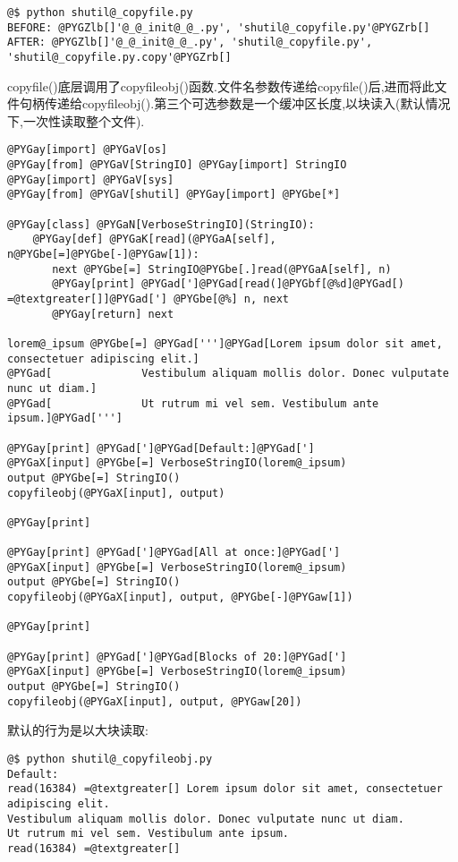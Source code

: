 \documentclass[a4paper,10pt,english]{manual}
\begin{document}
\begin{Verbatim}[commandchars=@\[\]]
@$ python shutil@_copyfile.py
BEFORE: @PYGZlb[]'@_@_init@_@_.py', 'shutil@_copyfile.py'@PYGZrb[]
AFTER: @PYGZlb[]'@_@_init@_@_.py', 'shutil@_copyfile.py', 'shutil@_copyfile.py.copy'@PYGZrb[]
\end{Verbatim}

copyfile()底层调用了copyfileobj()函数.文件名参数传递给copyfile()后,进而将此文件句柄传递给copyfileobj().第三个可选参数是一个缓冲区长度,以块读入(默认情况下,一次性读取整个文件).

\begin{Verbatim}[commandchars=@\[\]]
@PYGay[import] @PYGaV[os]
@PYGay[from] @PYGaV[StringIO] @PYGay[import] StringIO
@PYGay[import] @PYGaV[sys]
@PYGay[from] @PYGaV[shutil] @PYGay[import] @PYGbe[*]

@PYGay[class] @PYGaN[VerboseStringIO](StringIO):
    @PYGay[def] @PYGaK[read](@PYGaA[self], n@PYGbe[=]@PYGbe[-]@PYGaw[1]):
       next @PYGbe[=] StringIO@PYGbe[.]read(@PYGaA[self], n)
       @PYGay[print] @PYGad[']@PYGad[read(]@PYGbf[@%d]@PYGad[) =@textgreater[]]@PYGad['] @PYGbe[@%] n, next
       @PYGay[return] next

lorem@_ipsum @PYGbe[=] @PYGad[''']@PYGad[Lorem ipsum dolor sit amet, consectetuer adipiscing elit.]
@PYGad[              Vestibulum aliquam mollis dolor. Donec vulputate nunc ut diam.]
@PYGad[              Ut rutrum mi vel sem. Vestibulum ante ipsum.]@PYGad[''']

@PYGay[print] @PYGad[']@PYGad[Default:]@PYGad[']
@PYGaX[input] @PYGbe[=] VerboseStringIO(lorem@_ipsum)
output @PYGbe[=] StringIO()
copyfileobj(@PYGaX[input], output)

@PYGay[print]

@PYGay[print] @PYGad[']@PYGad[All at once:]@PYGad[']
@PYGaX[input] @PYGbe[=] VerboseStringIO(lorem@_ipsum)
output @PYGbe[=] StringIO()
copyfileobj(@PYGaX[input], output, @PYGbe[-]@PYGaw[1])

@PYGay[print]

@PYGay[print] @PYGad[']@PYGad[Blocks of 20:]@PYGad[']
@PYGaX[input] @PYGbe[=] VerboseStringIO(lorem@_ipsum)
output @PYGbe[=] StringIO()
copyfileobj(@PYGaX[input], output, @PYGaw[20])
\end{Verbatim}

默认的行为是以大块读取:

\begin{Verbatim}[commandchars=@\[\]]
@$ python shutil@_copyfileobj.py
Default:
read(16384) =@textgreater[] Lorem ipsum dolor sit amet, consectetuer adipiscing elit.
Vestibulum aliquam mollis dolor. Donec vulputate nunc ut diam.
Ut rutrum mi vel sem. Vestibulum ante ipsum.
read(16384) =@textgreater[]
\end{Verbatim}
\end{document}
